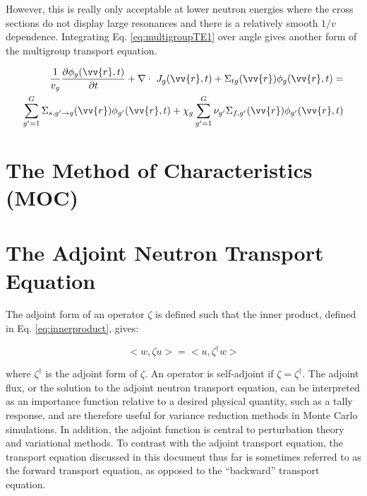 \documentclass[10pt]{article}
\begin{document}
\begin{flushleft}
However, this is really only acceptable at lower neutron energies where the cross sections do not display large resonances and there is a relatively smooth \(1/v\) dependence. Integrating Eq. \ref{eq:multigroupTE1} over angle gives another form of the multigroup transport equation.

\begin{equation}
\label{eq:multigroupTE2}
\begin{aligned}
\frac{1}{v_g} \frac{\partial\phi_g(\vv{r}, t)}{\partial t} + \nabla\cdot\ J_g(\vv{r}, t) + \Sigma_{tg}(\vv{r})\phi_g(\vv{r}, t) =\\
\sum_{g'=1}^{G} \Sigma_{s, g'\rightarrow g}(\vv{r})\phi_{g'}(\vv{r}, t) + \chi_g \sum_{g'=1}^{G} \nu_{g'}\Sigma_{f,g'}(\vv{r})\phi_{g'}(\vv{r}, t)
\end{aligned}
\end{equation}





\section{The Method of Characteristics (MOC)}








\section{The Adjoint Neutron Transport Equation}

The adjoint form of an operator \(\zeta\) is defined such that the inner product, defined in Eq. \ref{eq:innerproduct}, gives:

\begin{equation}
\label{eq:AdjointDefinition}
<w, \zeta u> = <u, \zeta^\dagger w>
\end{equation}

where \(\zeta^\dagger\) is the adjoint form of \(\zeta\). An operator is self-adjoint if \(\zeta=\zeta^\dagger\). The adjoint flux, or the solution to the adjoint neutron transport equation, can be interpreted as an importance function relative to a desired physical quantity, such as a tally response, and are therefore useful for variance reduction methods in Monte Carlo simulations. In addition, the adjoint function is central to perturbation theory and variational methods. To contrast with the adjoint transport equation, the transport equation discussed in this document thus far is sometimes referred to as the forward transport equation, as opposed to the ``backward'' transport equation. 


\end{flushleft}
\end{document}
